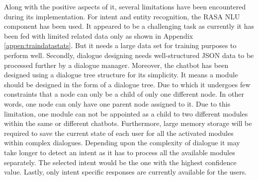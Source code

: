 Along with the positive aspects of it, several limitations have been encountered during its implementation. For intent and entity recognition, the RASA NLU component has been used. It appeared to be a challenging task as currently it has been fed with limited related data only as shown in Appendix \ref{appen:traindatastats}. But it needs a large data set for training purposes to perform well. Secondly, dialogue designing needs well-structured JSON data to be processed further by a dialogue manager. Moreover, the chatbot has been designed using a dialogue tree structure for its simplicity. It means a module should be designed in the form of a dialogue tree. Due to which it undergoes few constraints that a node can only be a child of only one different node. In other words, one node can only have one parent node assigned to it. Due to this limitation, one module can not be appointed as a child to two different modules within the same or different chatbots. Furthermore, large memory storage will be required to save the current state of each user for all the activated modules within complex dialogues. Depending upon the complexity of dialogue it may take longer to detect an intent as it has to process all the available modules separately. The selected intent would be the one with the highest confidence value. Lastly, only intent specific responses are currently available for the users.

